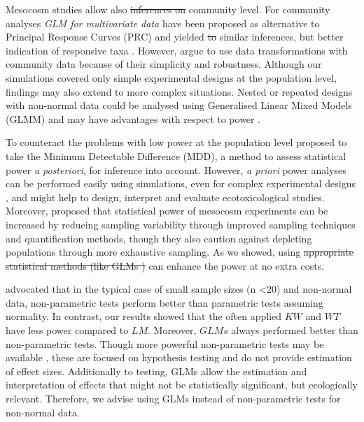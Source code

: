 \documentclass[twocolumn, natbib]{svjour3}
\providecommand{\DIFadd}[1]{{\protect\color{blue}\uwave{#1}}} %
\providecommand{\DIFdel}[1]{{\protect\color{red}\sout{#1}}}                      %
\providecommand{\DIFaddbegin}{} %
\providecommand{\DIFaddend}{} %
\providecommand{\DIFdelbegin}{} %
\providecommand{\DIFdelend}{} %
\begin{document}
Mesocosm studies allow also \DIFdelbegin \DIFdel{inferences on }\DIFdelend \DIFaddbegin \DIFadd{for inferences on the }\DIFaddend community level. 
For community analyses \emph{GLM for multivariate data} \citep{warton_distance-based_2012} have been proposed as alternative to Principal Response Curves (PRC) and yielded \DIFdelbegin \DIFdel{to }\DIFdelend similar inferences, but better indication of responsive taxa \citep{szocs_analysing_2015}. 
However, \citet{ter_braak_topics_2014} argue to use data transformations with community data because of their simplicity and robustness.
Although our simulations covered only simple experimental designs at the population level, findings may also extend to more complex situations. 
Nested or repeated designs with non-normal data could be analysed using Generalised Linear Mixed Models (GLMM) and may have advantages with respect to power \citep{stroup_rethinking_2014}.

To counteract the problems with low power at the population level \citet{brock_minimum_2015} proposed to take the Minimum Detectable Difference (MDD), a method to assess statistical power \emph{a posteriori}, for inference into account.
However, \emph{a priori} power analyses can be performed easily using simulations, even for complex experimental designs \DIFdelbegin %
\DIFdelend \DIFaddbegin \citep{johnson_power_2015}\DIFaddend , and might help to design, interpret and evaluate ecotoxicological studies.
Moreover, \citet{brock_minimum_2015} proposed that statistical power of mesocosm experiments can be increased by reducing sampling variability through improved sampling techniques and quantification methods, though they also caution against depleting populations through more exhaustive sampling.
As we showed, using \DIFdelbegin \DIFdel{appropriate statistical methods (like GLMs ) }\DIFdelend \DIFaddbegin \DIFadd{GLMs }\DIFaddend can enhance the power at no extra costs.

\citet{wang_making_2011} advocated that in the typical case of small sample sizes (n \textless 20) and non-normal data, non-parametric tests perform better than parametric tests assuming normality.
In contrast, our results showed that the often applied $KW$ and $WT$ have less power compared to $LM$.
Moreover, $GLMs$ always performed better than non-parametric tests. 
Though more powerful non-parametric tests may be available \citep{konietschke_rank-based_2012}, these are focused on hypothesis testing and do not provide estimation of effect sizes.
Additionally to testing, GLMs allow the estimation and interpretation of effects that might not be statistically significant, but ecologically relevant.
Therefore, we advise using GLMs instead of non-parametric tests for non-normal data.
\end{document}
